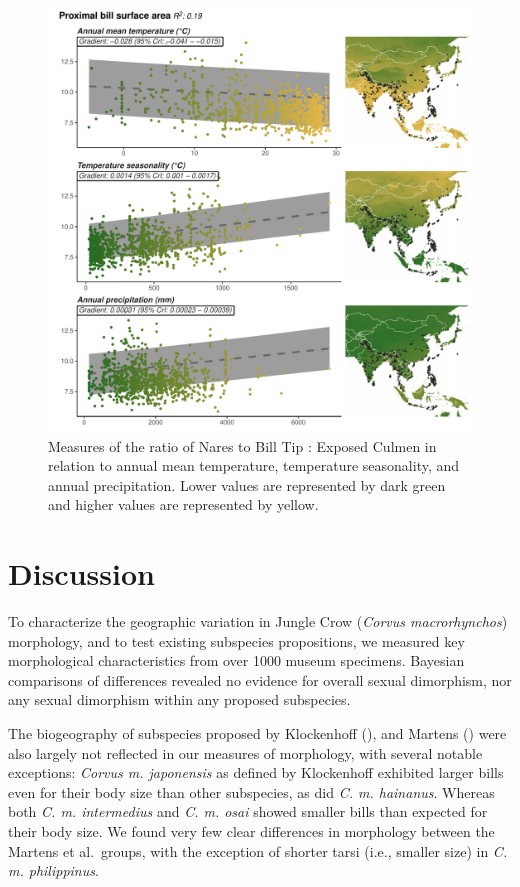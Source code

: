 \documentclass[10pt,a4paper]{article}
\begin{document}
\begin{figure}
\includegraphics[width=0.9\linewidth]{../Figures/climMap_ExCuNtBTxHaNaTaLe} \caption{Measures of the ratio of Nares to Bill Tip : Exposed Culmen in relation to annual mean temperature, temperature seasonality, and annual precipitation. Lower values are represented by dark green and higher values are represented by yellow.}\label{fig:climateComparisonMapPBSA}
\end{figure}

\section{Discussion}\label{discussion}

To characterize the geographic variation in Jungle Crow (\emph{Corvus macrorhynchos}) morphology, and to test existing subspecies propositions, we measured key morphological characteristics from over 1000 museum specimens.
Bayesian comparisons of differences revealed no evidence for overall sexual dimorphism, nor any sexual dimorphism within any proposed subspecies.

The biogeography of subspecies proposed by Klockenhoff (), and Martens () were also largely not reflected in our measures of morphology, with several notable exceptions: \emph{Corvus m. japonensis} as defined by Klockenhoff exhibited larger bills even for their body size than other subspecies, as did \emph{C. m. hainanus}.
Whereas both \emph{C. m. intermedius} and \emph{C. m. osai} showed smaller bills than expected for their body size.
We found very few clear differences in morphology between the Martens et al.~groups, with the exception of shorter tarsi (i.e., smaller size) in \emph{C. m. philippinus}.
\end{document}
